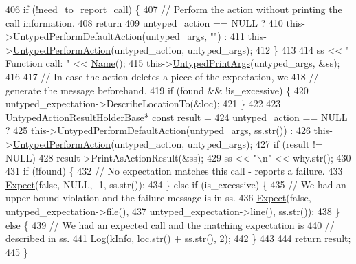 \begin{DoxyCode}
406   \textcolor{keywordflow}{if} (!need\_to\_report\_call) \{
407     \textcolor{comment}{// Perform the action without printing the call information.}
408     \textcolor{keywordflow}{return}
409         untyped\_action == NULL ?
410         this->\hyperlink{classtesting_1_1internal_1_1UntypedFunctionMockerBase_a2cb149456cd559d5b0615f2310b235e3}{UntypedPerformDefaultAction}(untyped\_args, \textcolor{stringliteral}{""}) :
411         this->\hyperlink{classtesting_1_1internal_1_1UntypedFunctionMockerBase_ada5a72303863d0aa655b66338b8efea5}{UntypedPerformAction}(untyped\_action, untyped\_args);
412   \}
413 
414   ss << \textcolor{stringliteral}{"    Function call: "} << \hyperlink{classtesting_1_1internal_1_1UntypedFunctionMockerBase_ae90a5b5d48db1e99634bc6ff39ded335}{Name}();
415   this->\hyperlink{classtesting_1_1internal_1_1UntypedFunctionMockerBase_a3bd7439b411fc00f7d9f9a6f9591ae2c}{UntypedPrintArgs}(untyped\_args, &ss);
416 
417   \textcolor{comment}{// In case the action deletes a piece of the expectation, we}
418   \textcolor{comment}{// generate the message beforehand.}
419   \textcolor{keywordflow}{if} (found && !is\_excessive) \{
420     untyped\_expectation->DescribeLocationTo(&loc);
421   \}
422 
423   UntypedActionResultHolderBase* \textcolor{keyword}{const} result =
424       untyped\_action == NULL ?
425       this->\hyperlink{classtesting_1_1internal_1_1UntypedFunctionMockerBase_a2cb149456cd559d5b0615f2310b235e3}{UntypedPerformDefaultAction}(untyped\_args, ss.str()) :
426       this->\hyperlink{classtesting_1_1internal_1_1UntypedFunctionMockerBase_ada5a72303863d0aa655b66338b8efea5}{UntypedPerformAction}(untyped\_action, untyped\_args);
427   \textcolor{keywordflow}{if} (result != NULL)
428     result->PrintAsActionResult(&ss);
429   ss << \textcolor{stringliteral}{"\(\backslash\)n"} << why.str();
430 
431   \textcolor{keywordflow}{if} (!found) \{
432     \textcolor{comment}{// No expectation matches this call - reports a failure.}
433     \hyperlink{namespacetesting_1_1internal_ab3000fc56be000e4fa6ed7cdcfee3106}{Expect}(\textcolor{keyword}{false}, NULL, -1, ss.str());
434   \} \textcolor{keywordflow}{else} \textcolor{keywordflow}{if} (is\_excessive) \{
435     \textcolor{comment}{// We had an upper-bound violation and the failure message is in ss.}
436     \hyperlink{namespacetesting_1_1internal_ab3000fc56be000e4fa6ed7cdcfee3106}{Expect}(\textcolor{keyword}{false}, untyped\_expectation->file(),
437            untyped\_expectation->line(), ss.str());
438   \} \textcolor{keywordflow}{else} \{
439     \textcolor{comment}{// We had an expected call and the matching expectation is}
440     \textcolor{comment}{// described in ss.}
441     \hyperlink{namespacetesting_1_1internal_ac0bc151763a8187d74387c4b2ba685c9}{Log}(\hyperlink{namespacetesting_1_1internal_a203d1a8a2147a53d12bbdae40d443914a396aacfaee2849eaab7c1de9773d624d}{kInfo}, loc.str() + ss.str(), 2);
442   \}
443 
444   \textcolor{keywordflow}{return} result;
445 \}
\end{DoxyCode}
